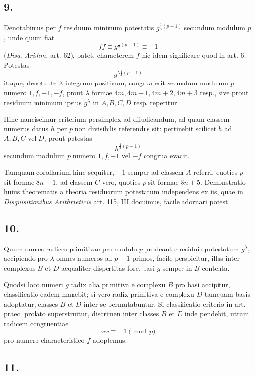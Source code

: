 \documentclass[12pt]{article}
\begin{document}
\subsection*{9.}

Denotabimus per $f$ residuum minimum potestatis $g^{\frac14(p-1)}$ secundum modulum $p$, unde quum fiat
\[
ff\equiv g^{\frac12(p-1)}\equiv -1
\]
(\emph{Disq. Arithm.} art. 62), patet, characterem $f$ hic idem significare quod in art. 6. Potestas
\[
g^{\lambda\frac14(p-1)}
\]
itaque, denotante $\lambda$ integrum positivum, congrua erit secundum modulum $p$ numero $1,f,-1,-f$, prout $\lambda$ formae $4m,4m+1,4m+2,4m+3$ resp., sive prout residuum minimum ipsius $g^\lambda$ in $A,B,C,D$ resp. reperitur.

Hinc nanciscimur criterium persimplex ad diiudicandum, ad quam classem numerus datus $h$ per $p$ non divisibilis referendus sit: pertinebit scilicet $h$ ad $A,B,C$ vel $D$, prout potestas
\[
h^{\frac14(p-1)}
\]
secundum modulum $p$ numero $1,f,-1$ vel $-f$ congrua evadit.

Tamquam corollarium hinc sequitur, $-1$ semper ad classem $A$ referri, quoties $p$ sit formae $8n+1$, ad classem $C$ vero, quoties $p$ sit formae $8n+5$. Demonstratio huius theorematis a theoria residuorum potestatum independens ex iis, quae in \emph{Disquisitionibus Arithmeticis} art. 115, III docuimus, facile adornari potest.

\subsection*{10.}

Quum omnes radices primitivae pro modulo $p$ prodeant e residuis potestatum $g^\lambda$, accipiendo pro $\lambda$ omnes numeros ad $p-1$ primos, facile perspicitur, illas inter complexus $B$ et $D$ aequaliter dispertitas fore, basi $g$ semper in $B$ contenta.

Quodsi loco numeri $g$ radix alia primitiva e complexu $B$ pro basi accipitur, classificatio eadem manebit; si vero radix primitiva e complexu $D$ tamquam basis adoptatur, classes $B$ et $D$ inter se permutabuntur. Si classificatio criterio in art. praec. prolato superstruitur, discrimen inter classes $B$ et $D$ inde pendebit, utram radicem congruentiae
\[
xx\equiv -1\pmod p
\]
pro numero characteristico $f$ adoptemus.

\subsection*{11.}
\end{document}
